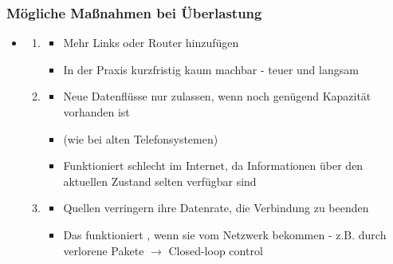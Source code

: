 \subsubsection*{Mögliche Maßnahmen bei Überlastung}
\begin{itemize}
    \item {}
    \begin{enumerate}
        \item {}
        \begin{itemize}
            \item Mehr Links oder Router hinzufügen
            \item {} In der Praxis kurzfristig kaum machbar - teuer und langsam
        \end{itemize}
        \item {}
        \begin{itemize}
            \item Neue Datenflüsse nur zulassen, wenn noch genügend Kapazität vorhanden ist
            \item {} (wie bei alten Telefonsystemen)
            \item Funktioniert schlecht im Internet, da Informationen über den aktuellen Zustand selten verfügbar sind
        \end{itemize}
        \item {}
        \begin{itemize}
            \item Quellen verringern ihre Datenrate,  die Verbindung zu beenden
            \item Das funktioniert , wenn sie  vom Netzwerk bekommen - z.B. durch verlorene Pakete $\rightarrow$ Closed-loop control
        \end{itemize}
    \end{enumerate}
\end{itemize}
